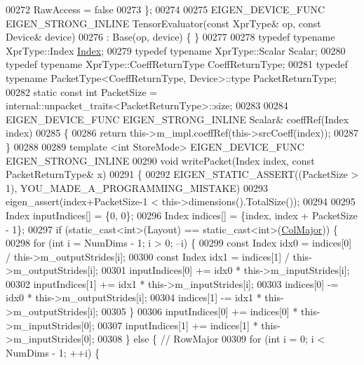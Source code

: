 \begin{DoxyCode}
00272     RawAccess = \textcolor{keyword}{false}
00273   \};
00274 
00275   EIGEN\_DEVICE\_FUNC EIGEN\_STRONG\_INLINE TensorEvaluator(\textcolor{keyword}{const} XprType& op, \textcolor{keyword}{const} Device& device)
00276       : Base(op, device) \{ \}
00277 
00278   \textcolor{keyword}{typedef} \textcolor{keyword}{typename} XprType::Index \hyperlink{namespace_eigen_a62e77e0933482dafde8fe197d9a2cfde}{Index};
00279   \textcolor{keyword}{typedef} \textcolor{keyword}{typename} XprType::Scalar Scalar;
00280   \textcolor{keyword}{typedef} \textcolor{keyword}{typename} XprType::CoeffReturnType CoeffReturnType;
00281   \textcolor{keyword}{typedef} \textcolor{keyword}{typename} PacketType<CoeffReturnType, Device>::type PacketReturnType;
00282   \textcolor{keyword}{static} \textcolor{keyword}{const} \textcolor{keywordtype}{int} PacketSize = internal::unpacket\_traits<PacketReturnType>::size;
00283 
00284   EIGEN\_DEVICE\_FUNC EIGEN\_STRONG\_INLINE Scalar& coeffRef(Index index)
00285   \{
00286     \textcolor{keywordflow}{return} this->m\_impl.coeffRef(this->srcCoeff(index));
00287   \}
00288 
00289   \textcolor{keyword}{template} <\textcolor{keywordtype}{int} StoreMode> EIGEN\_DEVICE\_FUNC EIGEN\_STRONG\_INLINE
00290   \textcolor{keywordtype}{void} writePacket(Index index, \textcolor{keyword}{const} PacketReturnType& x)
00291   \{
00292     EIGEN\_STATIC\_ASSERT((PacketSize > 1), YOU\_MADE\_A\_PROGRAMMING\_MISTAKE)
00293     eigen\_assert(index+PacketSize-1 < this->dimensions().TotalSize());
00294 
00295     Index inputIndices[] = \{0, 0\};
00296     Index indices[] = \{index, index + PacketSize - 1\};
00297     \textcolor{keywordflow}{if} (static\_cast<int>(Layout) == static\_cast<int>(\hyperlink{group__enums_ggaacded1a18ae58b0f554751f6cdf9eb13a0cbd4bdd0abcfc0224c5fcb5e4f6669a}{ColMajor})) \{
00298       \textcolor{keywordflow}{for} (\textcolor{keywordtype}{int} i = NumDims - 1; i > 0; --i) \{
00299         \textcolor{keyword}{const} Index idx0 = indices[0] / this->m\_outputStrides[i];
00300         \textcolor{keyword}{const} Index idx1 = indices[1] / this->m\_outputStrides[i];
00301         inputIndices[0] += idx0 * this->m\_inputStrides[i];
00302         inputIndices[1] += idx1 * this->m\_inputStrides[i];
00303         indices[0] -= idx0 * this->m\_outputStrides[i];
00304         indices[1] -= idx1 * this->m\_outputStrides[i];
00305       \}
00306       inputIndices[0] += indices[0] * this->m\_inputStrides[0];
00307       inputIndices[1] += indices[1] * this->m\_inputStrides[0];
00308     \} \textcolor{keywordflow}{else} \{  \textcolor{comment}{// RowMajor}
00309       \textcolor{keywordflow}{for} (\textcolor{keywordtype}{int} i = 0; i < NumDims - 1; ++i) \{

\end{DoxyCode}
